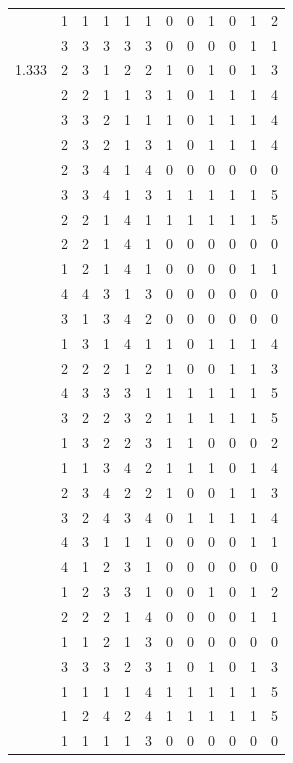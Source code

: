 \documentclass[]{book}
\theoremstyle{definition}
\theoremstyle{definition}
\theoremstyle{definition}
\theoremstyle{remark}
\begin{document}
\begin{table}
{\begin{tabular}[t]{rrrrrrrrrrrr}
 & 1 & 1 & 1 & 1 & 1 & 0 & 0 & 1 & 0 & 1 & 2\\
 & 3 & 3 & 3 & 3 & 3 & 0 & 0 & 0 & 0 & 1 & 1\\
1.333 & 2 & 3 & 1 & 2 & 2 & 1 & 0 & 1 & 0 & 1 & 3\\
 & 2 & 2 & 1 & 1 & 3 & 1 & 0 & 1 & 1 & 1 & 4\\
 & 3 & 3 & 2 & 1 & 1 & 1 & 0 & 1 & 1 & 1 & 4\\
 & 2 & 3 & 2 & 1 & 3 & 1 & 0 & 1 & 1 & 1 & 4\\
 & 2 & 3 & 4 & 1 & 4 & 0 & 0 & 0 & 0 & 0 & 0\\
 & 3 & 3 & 4 & 1 & 3 & 1 & 1 & 1 & 1 & 1 & 5\\
 & 2 & 2 & 1 & 4 & 1 & 1 & 1 & 1 & 1 & 1 & 5\\
 & 2 & 2 & 1 & 4 & 1 & 0 & 0 & 0 & 0 & 0 & 0\\
 & 1 & 2 & 1 & 4 & 1 & 0 & 0 & 0 & 0 & 1 & 1\\
 & 4 & 4 & 3 & 1 & 3 & 0 & 0 & 0 & 0 & 0 & 0\\
 & 3 & 1 & 3 & 4 & 2 & 0 & 0 & 0 & 0 & 0 & 0\\
 & 1 & 3 & 1 & 4 & 1 & 1 & 0 & 1 & 1 & 1 & 4\\
 & 2 & 2 & 2 & 1 & 2 & 1 & 0 & 0 & 1 & 1 & 3\\
 & 4 & 3 & 3 & 3 & 1 & 1 & 1 & 1 & 1 & 1 & 5\\
 & 3 & 2 & 2 & 3 & 2 & 1 & 1 & 1 & 1 & 1 & 5\\
 & 1 & 3 & 2 & 2 & 3 & 1 & 1 & 0 & 0 & 0 & 2\\
 & 1 & 1 & 3 & 4 & 2 & 1 & 1 & 1 & 0 & 1 & 4\\
 & 2 & 3 & 4 & 2 & 2 & 1 & 0 & 0 & 1 & 1 & 3\\
 & 3 & 2 & 4 & 3 & 4 & 0 & 1 & 1 & 1 & 1 & 4\\
 & 4 & 3 & 1 & 1 & 1 & 0 & 0 & 0 & 0 & 1 & 1\\
 & 4 & 1 & 2 & 3 & 1 & 0 & 0 & 0 & 0 & 0 & 0\\
 & 1 & 2 & 3 & 3 & 1 & 0 & 0 & 1 & 0 & 1 & 2\\
 & 2 & 2 & 2 & 1 & 4 & 0 & 0 & 0 & 0 & 1 & 1\\
 & 1 & 1 & 2 & 1 & 3 & 0 & 0 & 0 & 0 & 0 & 0\\
 & 3 & 3 & 3 & 2 & 3 & 1 & 0 & 1 & 0 & 1 & 3\\
 & 1 & 1 & 1 & 1 & 4 & 1 & 1 & 1 & 1 & 1 & 5\\
 & 1 & 2 & 4 & 2 & 4 & 1 & 1 & 1 & 1 & 1 & 5\\
 & 1 & 1 & 1 & 1 & 3 & 0 & 0 & 0 & 0 & 0 & 0\\

\end{tabular}}
\end{table}
\end{document}
